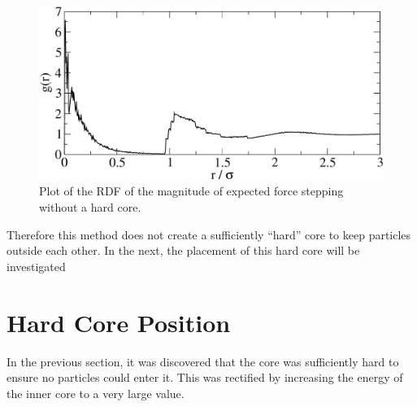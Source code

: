 \documentclass[12pt]{UoAthesis} \usepackage{booktabs}
\begin{document}
\begin{figure}[htp] 
  \begin{center}
    \includegraphics[clip,scale=0.45]{figures/noCoreRDF} 
    \caption{Plot of the RDF of the magnitude of expected force
      stepping without a hard core.}
    \label{fig:noCoreRDF}
  \end{center}
\end{figure}

Therefore this method does not create a sufficiently ``hard'' core to
keep particles outside each other.  In the next, the placement of this
hard core will be investigated

\section{Hard Core Position}

In the previous section, it was discovered that the core was
sufficiently hard to ensure no particles could enter it.  This was
rectified by increasing the energy of the inner core to a very large
value.  
\end{document}
